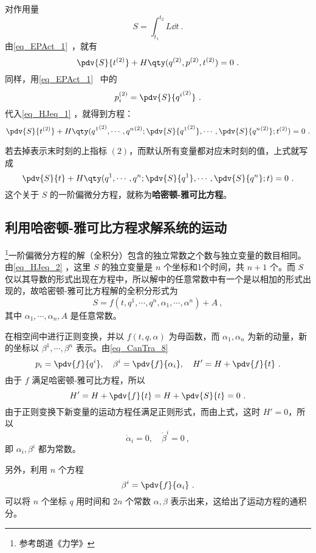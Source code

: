 
\begin{issues}
\issueTODO
\end{issues}


对作用量
\begin{equation}
S=\int_{t_1}^{t_2}L\dd t~.
\end{equation}
由\autoref{eq_EPAct_1}~，就有
\begin{equation}\label{eq_HJeq_1}
\pdv{S}{t^{(2)}}+H\qty(q^{(2)},p^{(2)},t^{(2)})=0~.
\end{equation}
同样，用\autoref{eq_EPAct_1}~ 中的
\begin{equation}
p_i^{(2)}=\pdv{S}{{q^i}^{(2)}}~.
\end{equation}
代入\autoref{eq_HJeq_1} ，就得到方程：
\begin{equation}
\pdv{S}{t^{(2)}}+H\qty({q^1}^{(2)},\cdots,{q^n}^{(2)};\pdv{S}{{q^1}^{(2)}},\cdots,\pdv{S}{{q^n}^{(2)}};t^{(2)})=0~.
\end{equation}

若去掉表示末时刻的上指标 $(2)$，而默认所有变量都对应末时刻的值，上式就写成
\begin{equation}\label{eq_HJeq_2}
\pdv{S}{t}+H\qty({q^1},\cdots,{q^n};\pdv{S}{{q^1}},\cdots,\pdv{S}{{q^n}};t)=0~.
\end{equation}
这个关于 $S$ 的一阶偏微分方程，就称为\textbf{哈密顿-雅可比方程}。
\subsection{利用哈密顿-雅可比方程求解系统的运动}
\footnote{参考朗道《力学》}一阶偏微分方程的解（全积分）包含的独立常数之个数与独立变量的数目相同。由\autoref{eq_HJeq_2} ，这里 $S$ 的独立变量是 $n$ 个坐标和1个时间，共 $n+1$ 个。而 $S$ 仅以其导数的形式出现在方程中，所以解中的任意常数中有一个是以相加的形式出现的，故哈密顿-雅可比方程解的全积分形式为
\begin{equation}
S=f(t,q^1,\cdots,q^n,\alpha_1,\cdots,\alpha^n)+A~,
\end{equation}
其中 $\alpha_1,\cdots,\alpha_n,A$ 是任意常数。

在相空间中进行正则变换，并以 $f(t,q,\alpha)$ 为母函数，而 $\alpha_1,\alpha_n$ 为新的动量，新的坐标以 $\beta^1,\cdots,\beta^n$ 表示。由\autoref{eq_CanTra_8}~
\begin{equation}
p_i=\pdv{f}{q^i},\quad \beta^i=\pdv{f}{\alpha_i},\quad H'=H+\pdv{f}{t}~.
\end{equation}
由于 $f$ 满足哈密顿-雅可比方程，所以
\begin{equation}
H'=H+\pdv{f}{t}=H+\pdv{S}{t}=0~.
\end{equation}
由于正则变换下新变量的运动方程任满足正则形式，而由上式，这时 $H'=0$，所以
\begin{equation}
\dot\alpha_i=0,\quad\dot\beta^i=0~,
\end{equation}
即 $\alpha_i,\beta^i$ 都为常数。

另外，利用 $n$ 个方程
\begin{equation}
\beta^i=\pdv{f}{\alpha_i}~.
\end{equation}
可以将 $n$ 个坐标 $q$ 用时间和 $2n$ 个常数 $\alpha,\beta$ 表示出来，这给出了运动方程的通积分。
